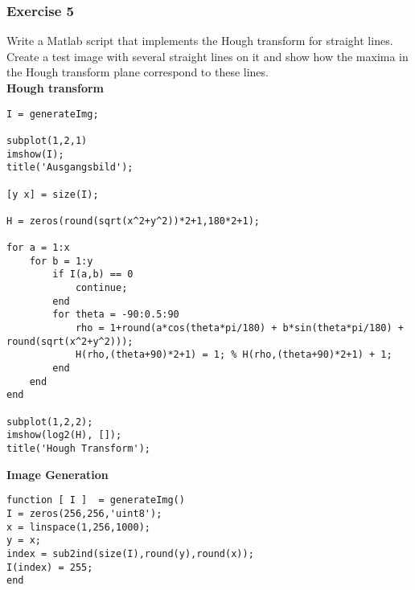 \subsubsection{Exercise 5}
Write a Matlab script that implements the Hough transform for straight lines. Create a test image with several straight lines on it and show how the maxima in the Hough transform plane correspond to these lines.\\
\textbf{Hough transform}
\begin{lstlisting}
I = generateImg;

subplot(1,2,1)
imshow(I);
title('Ausgangsbild');

[y x] = size(I);

H = zeros(round(sqrt(x^2+y^2))*2+1,180*2+1);

for a = 1:x
    for b = 1:y
        if I(a,b) == 0
            continue;            
        end
        for theta = -90:0.5:90
            rho = 1+round(a*cos(theta*pi/180) + b*sin(theta*pi/180) + round(sqrt(x^2+y^2)));
            H(rho,(theta+90)*2+1) = 1; % H(rho,(theta+90)*2+1) + 1;
        end
    end
end

subplot(1,2,2);
imshow(log2(H), []);
title('Hough Transform');
\end{lstlisting}
\textbf{Image Generation}
\begin{lstlisting}
function [ I ]  = generateImg()
I = zeros(256,256,'uint8');
x = linspace(1,256,1000);
y = x;
index = sub2ind(size(I),round(y),round(x));
I(index) = 255;
end
\end{lstlisting}